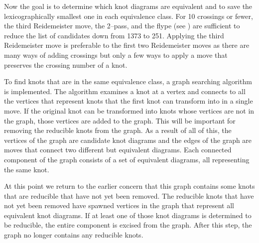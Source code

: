 \begin{paper}
Now the goal is to determine which knot diagrams are equivalent and to save the
lexicographically smallest one in each equivalence class.
For 10 crossings or fewer, the third Reidemeister move, the 2--pass, and the
flype (see \figMoves) are sufficient to reduce the list of candidates down
from 1373 to 251.
Applying the third Reidemeister move is preferable to the first two
Reidemeister moves as there are many ways of adding crossings but only a few
ways to apply a move that preserves the crossing number of a knot.

To find knots that are in the same equivalence class, a graph searching
algorithm is implemented.
The algorithm examines a knot at a vertex and connects to all the vertices that
represent knots that the first knot can transform into in a single move.
If the original knot can be transformed into knots whose vertices are not in the
graph, those vertices are added to the graph.
This will be important for removing the reducible knots from the graph.
As a result of all of this, the vertices of the graph are candidate knot
diagrams and the edges of the graph are moves that connect two different but
equivalent diagrams.
Each connected component of the graph consists of a set of equivalent diagrams,
all representing the same knot.

At this point we return to the earlier concern that this graph contains some
knots that are reducible that have not yet been removed.
The reducible knots that have not yet been removed have spawned vertices in the
graph that represent all equivalent knot diagrams.
If at least one of those knot diagrams is determined to be reducible, the entire
component is excised from the graph.
After this step, the graph no longer contains any reducible knots.\\

\\

\vspace{-4.5em}\hspace{15ex}{\fontsize{20pt}{1em}\selectfont$\equiv$}\\

\vspace{-5em}\hfill{}\\



\end{paper}
